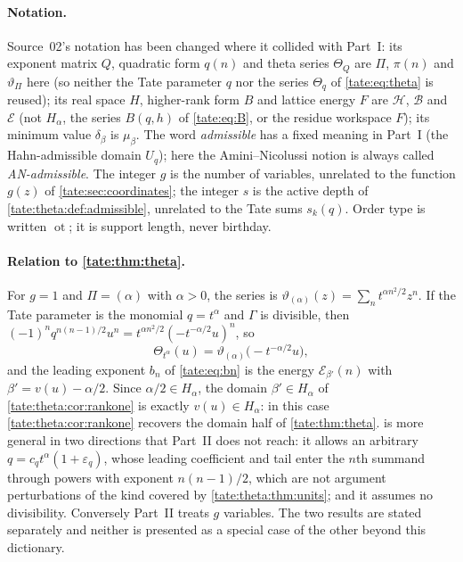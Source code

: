 \documentclass[11pt,letterpaper]{article}
\theoremstyle{definition}
\newcommand{\ordtype}{\operatorname{ot}}
\newcommand{\cB}{\mathcal B}
\newcommand{\cH}{\mathcal H}
\newcommand{\cE}{\mathcal E}
\begin{document}
\paragraph{Notation.}
Source~02's notation has been changed where it collided with Part~I:
its exponent matrix $Q$, quadratic form $q(n)$ and theta series
$\Theta_Q$ are $\Pi$, $\pi(n)$ and $\vartheta_\Pi$ here (so neither the Tate
parameter $q$ nor the series $\Theta_q$ of \eqref{tate:eq:theta} is
reused); its real space $H$, higher-rank form $B$ and lattice energy $F$ are
$\cH$, $\cB$ and $\cE$ (not $H_\alpha$, the series $B(q,h)$ of
\eqref{tate:eq:B}, or the residue workspace $F$); its minimum value
$\delta_\beta$ is $\mu_\beta$. The word \emph{admissible} has a fixed
meaning in Part~I (the Hahn-admissible domain $U_q$); here the
Amini--Nicolussi notion is always called \emph{AN-admissible}. The integer
$g$ is the number of variables, unrelated to the function $g(z)$ of
\cref{tate:sec:coordinates}; the integer $s$ is the active depth of
\cref{tate:theta:def:admissible}, unrelated to the Tate sums $s_k(q)$.
Order type is written $\ordtype$; it is support length, never birthday.

\paragraph{Relation to \cref{tate:thm:theta}.}
For $g=1$ and $\Pi=(\alpha)$ with $\alpha>0$, the series is
$\vartheta_{(\alpha)}(z)=\sum_nt^{\alpha n^2/2}z^n$. If the Tate parameter is
the monomial $q=t^\alpha$ and $\Gamma$ is divisible, then
$(-1)^nq^{n(n-1)/2}u^n=t^{\alpha n^2/2}(-t^{-\alpha/2}u)^n$, so
\[
 \Theta_{t^\alpha}(u)=\vartheta_{(\alpha)}\bigl(-t^{-\alpha/2}u\bigr),
\]
and the leading exponent $b_n$ of \eqref{tate:eq:bn} is the energy
$\cE_{\beta'}(n)$ with $\beta'=v(u)-\alpha/2$. Since $\alpha/2\in H_\alpha$,
the domain $\beta'\in H_\alpha$ of \cref{tate:theta:cor:rankone} is exactly
$v(u)\in H_\alpha$: in this case \cref{tate:theta:cor:rankone} recovers the
domain half of \cref{tate:thm:theta}.  is more
general in two directions that Part~II does not reach: it allows an
arbitrary $q=c_qt^\alpha(1+\varepsilon_q)$, whose leading coefficient and
tail enter the $n$th summand through powers with exponent $n(n-1)/2$, which
are not argument perturbations of the kind covered by
\cref{tate:theta:thm:units}; and it assumes no divisibility. Conversely
Part~II treats $g$ variables. The two results are stated separately and
neither is presented as a special case of the other beyond this
dictionary.
\end{document}
